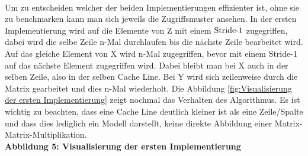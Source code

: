 \documentclass[sigconf,language=ngerman]{acmart}
\begin{document}
\,\\Um zu entscheiden welcher der beiden Implementierungen effizienter ist,
ohne sie zu benchmarken kann man sich jeweils die Zugriffsmuster ansehen.
In der ersten Implementierung wird auf die Elemente von Z mit einem $\textnormal{Stride-1}$ zugegriffen,
dabei wird die selbe Zeile n-Mal durchlaufen bis die nächste Zeile bearbeitet wird.
Auf das gleiche Element von X wird n-Mal zugegriffen, bevor mit einem Stride-1 auf das nächste Element zugegriffen wird.
Dabei bleibt man bei X auch in der selben Zeile, also in der selben Cache Line.
Bei Y wird sich zeilenweise durch die Matrix gearbeitet und dies n-Mal wiederholt. Die Abbildung \ref{fig:Visualisierung der ersten Implementierung}
zeigt nochmal das Verhalten des Algorithmus.
Es ist wichtig zu beachten, dass eine Cache Line deutlich kleiner ist als eine Zeile/Spalte und dass dies lediglich ein Modell darstellt, 
keine direkte Abbildung einer Matrix-Matrix-Multiplikation.\\
\textbf{Abbildung 5: Visualisierung der ersten Implementierung}
\label{fig:Visualisierung der ersten Implementierung}
\end{document}
